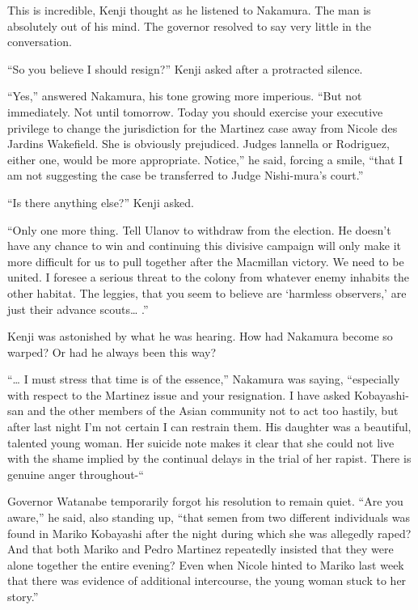 \documentclass[]{article}
\begin{document}
{This is incredible, Kenji thought as he listened to Nakamura.  The man is absolutely out of his mind.  The governor resolved to say very little in the conversation.

“So you believe I should resign?” Kenji asked after a protracted silence.

“Yes,” answered Nakamura, his tone growing more imperious.  “But not immediately.  Not until tomorrow.  Today you should exercise your executive privilege to change the jurisdiction for the Martinez case away from Nicole des Jardins Wakefield.  She is obviously prejudiced.  Judges lannella or Rodriguez, either one, would be more appropriate.  Notice,” he said, forcing a smile, “that I am not suggesting the case be transferred to Judge Nishi-mura’s court.”

“Is there anything else?” Kenji asked.

“Only one more thing.  Tell Ulanov to withdraw from the election.  He doesn’t have any chance to win and continuing this divisive campaign will only make it more difficult for us to pull together after the Macmillan victory.  We need to be united.  I foresee a serious threat to the colony from whatever enemy inhabits the other habitat.  The leggies, that you seem to believe are ‘harmless observers,’ are just their advance scouts… .”

Kenji was astonished by what he was hearing.  How had Nakamura become so warped? Or had he always been this way?

“… I must stress that time is of the essence,” Nakamura was saying, “especially with respect to the Martinez issue and your resignation.  I have asked Kobayashi-san and the other members of the Asian community not to act too hastily, but after last night I’m not certain I can restrain them.  His daughter was a beautiful, talented young woman.  Her suicide note makes it clear that she could not live with the shame implied by the continual delays in the trial of her rapist.  There is genuine anger throughout-“

Governor Watanabe temporarily forgot his resolution to remain quiet.  “Are you aware,” he said, also standing up, “that semen from two different individuals was found in Mariko Kobayashi after the night during which she was allegedly raped? And that both Mariko and Pedro Martinez repeatedly insisted that they were alone together the entire evening? Even when Nicole hinted to Mariko last week that there was evidence of additional intercourse, the young woman stuck to her story.”

}
\end{document}
